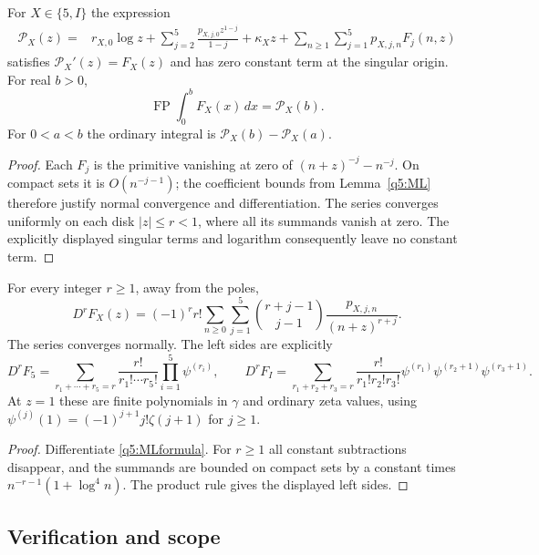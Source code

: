 \begin{corollary}\label{q5:primitives}
For $X\in\{5,I\}$ the expression
\begin{align}\label{q5:primitiveformula}
 \mathcal P_X(z)={}&r_{X,0}\log z
       +\sum_{j=2}^5\frac{p_{X,j,0}z^{1-j}}{1-j}
       +\kappa_Xz
       +\sum_{n\geq1}\sum_{j=1}^5p_{X,j,n}F_j(n,z)
\end{align}
satisfies $\mathcal P_X'(z)=F_X(z)$ and has zero constant term
at the singular origin.  For real $b>0$,
\[
 \operatorname{FP}\int_0^bF_X(x)\,dx=\mathcal P_X(b).
\]
For $0<a<b$ the ordinary integral is
$\mathcal P_X(b)-\mathcal P_X(a)$.
\end{corollary}
\begin{proof}
Each $F_j$ is the primitive vanishing at zero of
$(n+z)^{-j}-n^{-j}$.  On compact sets it is $O(n^{-j-1})$;
the coefficient bounds from Lemma~\ref{q5:ML} therefore justify normal
convergence and differentiation.  The series converges uniformly on
each disk $|z|\leq r<1$, where all its summands vanish at zero.
The explicitly displayed singular terms and logarithm consequently
leave no constant term.
\end{proof}

\begin{corollary}\label{q5:derivative}
For every integer $r\geq1$, away from the poles,
\begin{equation}\label{q5:derivatives}
 D^rF_X(z)=(-1)^r r!
       \sum_{n\geq0}\sum_{j=1}^5
       \binom{r+j-1}{j-1}\frac{p_{X,j,n}}{(n+z)^{r+j}}.
\end{equation}
The series converges normally.  The left sides are explicitly
\[
 D^rF_5=
 \sum_{r_1+\cdots+r_5=r}\frac{r!}{r_1!\cdots r_5!}
                  \prod_{i=1}^5\psi^{(r_i)},
 \qquad
 D^rF_I=
 \sum_{r_1+r_2+r_3=r}\frac{r!}{r_1!r_2!r_3!}
         \psi^{(r_1)}\psi^{(r_2+1)}\psi^{(r_3+1)}.
\]
At $z=1$ these are finite polynomials in $\gamma$ and ordinary
zeta values, using
$\psi^{(j)}(1)=(-1)^{j+1}j!\zeta(j+1)$ for $j\geq1$.
\end{corollary}
\begin{proof}
Differentiate \eqref{q5:MLformula}.  For $r\geq1$ all constant
subtractions disappear, and the summands are bounded on compact sets
by a constant times $n^{-r-1}(1+\log^4n)$.  The product rule gives
the displayed left sides.
\end{proof}

\subsection{Verification and scope}

